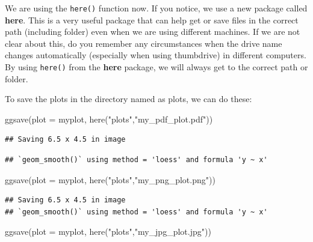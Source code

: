 \documentclass[
  10pt,
]{krantz}
\newenvironment{Shaded}{\begin{snugshade}}{\end{snugshade}}
\newcommand{\AttributeTok}[1]{\textcolor[rgb]{0.77,0.63,0.00}{#1}}
\newcommand{\FunctionTok}[1]{\textcolor[rgb]{0.00,0.00,0.00}{#1}}
\newcommand{\NormalTok}[1]{#1}
\newcommand{\StringTok}[1]{\textcolor[rgb]{0.31,0.60,0.02}{#1}}
\begin{document}
We are using the \texttt{here()} function now. If you notice, we use a new package called \textbf{here}. This is a very useful package that can help get or save files in the correct path (including folder) even when we are using different machines. If we are not clear about this, do you remember any circumstances when the drive name changes automatically (especially when using thumbdrive) in different computers. By using \texttt{here()} from the \textbf{here} package, we will always get to the correct path or folder.

To save the plots in the directory named as plots, we can do these:

\begin{Shaded}
\begin{Highlighting}[]
\FunctionTok{ggsave}\NormalTok{(}\AttributeTok{plot =}\NormalTok{ myplot, }
       \FunctionTok{here}\NormalTok{(}\StringTok{"plots"}\NormalTok{,}\StringTok{"my\_pdf\_plot.pdf"}\NormalTok{))}
\end{Highlighting}
\end{Shaded}

\begin{verbatim}
## Saving 6.5 x 4.5 in image
\end{verbatim}

\begin{verbatim}
## `geom_smooth()` using method = 'loess' and formula 'y ~ x'
\end{verbatim}

\begin{Shaded}
\begin{Highlighting}[]
\FunctionTok{ggsave}\NormalTok{(}\AttributeTok{plot =}\NormalTok{ myplot, }
       \FunctionTok{here}\NormalTok{(}\StringTok{"plots"}\NormalTok{,}\StringTok{"my\_png\_plot.png"}\NormalTok{)) }
\end{Highlighting}
\end{Shaded}

\begin{verbatim}
## Saving 6.5 x 4.5 in image
## `geom_smooth()` using method = 'loess' and formula 'y ~ x'
\end{verbatim}

\begin{Shaded}
\begin{Highlighting}[]
\FunctionTok{ggsave}\NormalTok{(}\AttributeTok{plot =}\NormalTok{ myplot, }
       \FunctionTok{here}\NormalTok{(}\StringTok{"plots"}\NormalTok{,}\StringTok{"my\_jpg\_plot.jpg"}\NormalTok{))}
\end{Highlighting}
\end{Shaded}
\end{document}

